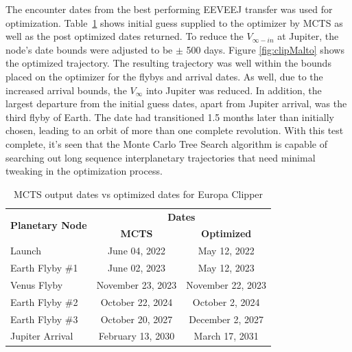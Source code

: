 \documentclass[letterpaper, paper,11pt]{AAS}	%
\begin{document}
The encounter dates from the best performing EEVEEJ transfer was used for optimization. Table~\ref*{table:clipMInputs} shows initial guess supplied to the optimizer by MCTS as well as the post optimized dates returned. To reduce the $V_{\infty-in}$ at Jupiter, the node's date bounds were adjusted to be $\pm$ 500 days. Figure \ref*{fig:clipMalto} shows the optimized trajectory. The resulting trajectory was well within the bounds placed on the optimizer for the flybys and arrival dates. As well, due to the increased arrival bounds, the $V_\infty$ into Jupiter was reduced. In addition, the largest departure from the initial guess dates, apart from Jupiter arrival, was the third flyby of Earth. The date had transitioned 1.5 months later than initially chosen, leading to an orbit of more than one complete revolution. With this test complete, it's seen that the Monte Carlo Tree Search algorithm is capable of searching out long sequence interplanetary trajectories that need minimal tweaking in the optimization process.
\begin{table}[htb]
    \begin{center}
        \caption{MCTS output dates vs optimized dates for Europa Clipper}
        \label{table:clipMInputs}
        \begin{tabular}{lcc}
            \toprule
            \multirow{2}{*}{\textbf{Planetary Node}} & \multicolumn{2}{c}{\textbf{Dates}}\\
            \cmidrule{2-3}
            {} & \textbf{MCTS} & \textbf{Optimized}\\
            \midrule
            Launch          & June 04, 2022     & May 12, 2022 \\
            Earth Flyby \#1 & June 02, 2023     & May 12, 2023 \\
            Venus Flyby     & November 23, 2023 & November 22, 2023 \\
            Earth Flyby \#2 & October 22, 2024  & October 2, 2024 \\
            Earth Flyby \#3 & October 20, 2027  & December 2, 2027 \\
            Jupiter Arrival & February 13, 2030 & March 17, 2031 \\
            \bottomrule
        \end{tabular}
    \end{center}
\end{table}
\end{document}

